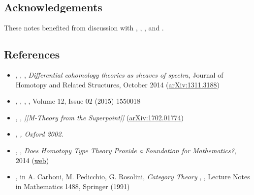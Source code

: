 \documentclass[12pt,titlepage]{article}
\theoremstyle{plain}
\theoremstyle{definition}
\theoremstyle{remark}
\begin{document}
\hypertarget{acknowledgements}{}\subsection*{{Acknowledgements}}\label{acknowledgements}

These notes benefited from discussion with , , ,  and .

\hypertarget{references}{}\subsection*{{References}}\label{references}

\begin{itemize}%
\item {}, , , \emph{Differential cohomology theories as sheaves of spectra}, Journal of Homotopy and Related Structures, October 2014 (\href{http://arxiv.org/abs/1311.3188}{arXiv:1311.3188})


\item {}, , , , Volume 12, Issue 02 (2015) 1550018


\item {}, , \emph{[[M-Theory from the Superpoint]]} (\href{https://arxiv.org/abs/1702.01774}{arXiv:1702.01774})


\item {}, \emph{, Oxford 2002.}


\item {}, , \emph{Does Homotopy Type Theory Provide a Foundation for Mathematics?}, 2014 (\href{http://philsci-archive.pitt.edu/11143/}{web})


\item {},  in A. Carboni, M. Pedicchio, G. Rosolini, \emph{Category Theory} , , Lecture Notes in Mathematics 1488, Springer (1991)



\end{itemize}
\end{document}
